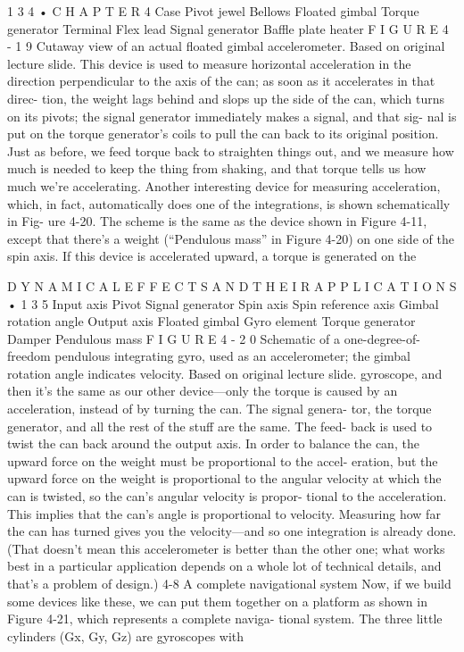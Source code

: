 \documentclass[10pt,oneside]{article}
\begin{document}
1 3 4 • C H A P T E R  4 Case Pivot jewel Bellows Floated gimbal Torque generator Terminal Flex lead Signal generator Baffle plate heater F I G U R E  4 - 1 9 Cutaway view of an actual floated gimbal accelerometer. Based on original lecture slide. This device is used to measure horizontal acceleration in the direction perpendicular to the axis of the can; as soon as it accelerates in that direc- tion, the weight lags behind and slops up the side of the can, which turns on its pivots; the signal generator immediately makes a signal, and that sig- nal is put on the torque generator’s coils to pull the can back to its original position. Just as before, we feed torque back to straighten things out, and we measure how much is needed to keep the thing from shaking, and that torque tells us how much we’re accelerating. Another interesting device for measuring acceleration, which, in fact, automatically does one of the integrations, is shown schematically in Fig- ure 4-20. The scheme is the same as the device shown in Figure 4-11, except that there’s a weight (“Pendulous mass” in Figure 4-20) on one side of the spin axis. If this device is accelerated upward, a torque is generated on the\par

D Y N A M I C A L  E F F E C T S  A N D  T H E I R  A P P L I C A T I O N S • 1 3 5 Input axis Pivot Signal generator Spin axis Spin reference axis Gimbal rotation angle Output axis Floated gimbal Gyro element Torque generator Damper Pendulous mass F I G U R E  4 - 2 0 Schematic of a one-degree-of-freedom pendulous integrating gyro, used as an accelerometer; the gimbal rotation angle indicates velocity. Based on original lecture slide. gyroscope, and then it’s the same as our other device---only the torque is caused by an acceleration, instead of by turning the can. The signal genera- tor, the torque generator, and all the rest of the stuff are the same. The feed- back is used to twist the can back around the output axis. In order to balance the can, the upward force on the weight must be proportional to the accel- eration, but the upward force on the weight is proportional to the angular velocity at which the can is twisted, so the can’s angular velocity is propor- tional to the acceleration. This implies that the can’s angle is proportional to velocity. Measuring how far the can has turned gives you the velocity---and so one integration is already done. (That doesn’t mean this accelerometer is better than the other one; what works best in a particular application depends on a whole lot of technical details, and that’s a problem of design.) 4-8 A complete navigational system Now, if we build some devices like these, we can put them together on a platform as shown in Figure 4-21, which represents a complete naviga- tional system. The three little cylinders (Gx, Gy, Gz) are gyroscopes with\par
\end{document}
